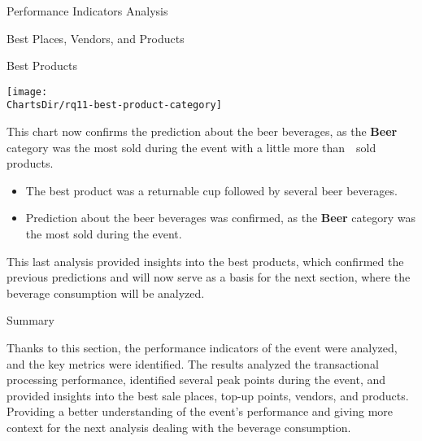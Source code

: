 \begin{section}{Performance Indicators Analysis}
\begin{subsection}{Best Places, Vendors, and Products}
\begin{subsubsection}{Best Products}
			\begin{chart}[h]
				\centering
				\texttt{[image: \\ChartsDir/rq11-best-product-category]}
				\caption{ Best Products by Category}
				\label{chart:best-product-category}
				\source
			\end{chart}

			This chart now confirms the prediction about the beer beverages, as the \textbf{Beer} category was the most sold during the event with a little more than~~sold products.

			\begin{keytakeaways}
				\begin{itemize}
					\item The best product was a returnable cup followed by several beer beverages.
					\item Prediction about the beer beverages was confirmed, as the \textbf{Beer} category was the most sold during the event.
				\end{itemize}
			\end{keytakeaways}

			This last analysis provided insights into the best products, which confirmed the previous predictions and will now serve as a basis for the next section, where the beverage consumption will be analyzed.
		\end{subsubsection}
	\end{subsection}

	\begin{subsection}{Summary}
		\label{subsec:analysis-performance-indicators-summary}

		Thanks to this section, the performance indicators of the event were analyzed, and the key metrics were identified.
		The results analyzed the transactional processing performance, identified several peak points during the event, and provided insights into the best sale places, top-up points, vendors, and products.
		Providing a better understanding of the event's performance and giving more context for the next analysis dealing with the beverage consumption.
	\end{subsection}
\end{section}
\pagebreak[4]

